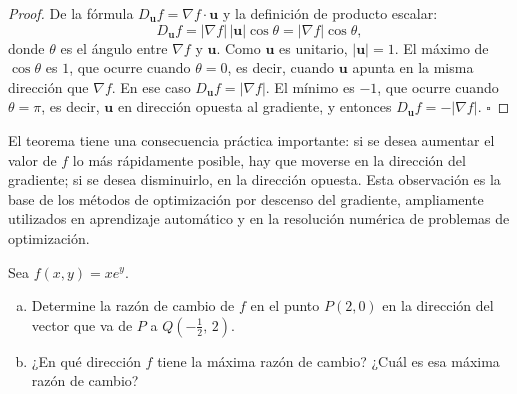 \begin{proof}
De la fórmula $D_{\mathbf{u}} f = \nabla f \cdot \mathbf{u}$ y la
definición de producto escalar:
\[
D_{\mathbf{u}} f = |\nabla f|\,|\mathbf{u}|\cos\theta
= |\nabla f|\cos\theta,
\]
donde $\theta$ es el ángulo entre $\nabla f$ y $\mathbf{u}$. Como
$\mathbf{u}$ es unitario, $|\mathbf{u}|=1$. El máximo de $\cos\theta$ es
$1$, que ocurre cuando $\theta=0$, es decir, cuando $\mathbf{u}$ apunta
en la misma dirección que $\nabla f$. En ese caso
$D_{\mathbf{u}} f = |\nabla f|$. El mínimo es $-1$, que ocurre cuando
$\theta=\pi$, es decir, $\mathbf{u}$ en dirección opuesta al gradiente,
y entonces $D_{\mathbf{u}} f = -|\nabla f|$. $\square$
\end{proof}

\begin{rem}
El teorema tiene una consecuencia práctica importante: si se desea
aumentar el valor de $f$ lo más rápidamente posible, hay que moverse en
la dirección del gradiente; si se desea disminuirlo, en la dirección
opuesta. Esta observación es la base de los métodos de optimización por
descenso del gradiente, ampliamente utilizados en aprendizaje automático
y en la resolución numérica de problemas de optimización.
\end{rem}

\begin{example}
Sea $f(x,y) = x e^y$.
\begin{enumerate}[a)]
    \item Determine la razón de cambio de $f$ en el punto $P(2,0)$ en la
    dirección del vector que va de $P$ a $Q\left(-\frac12,\,2\right)$.
    \item ¿En qué dirección $f$ tiene la máxima razón de cambio?
    ¿Cuál es esa máxima razón de cambio?
\end{enumerate}
\end{example}

